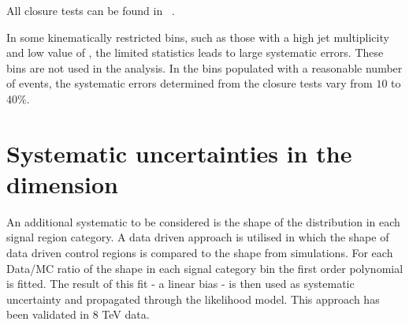 All closure tests can be found in ~\cite{alphaTnote}.


In some kinematically restricted bins, such as those with a high jet multiplicity and low value of \scalht, the
limited statistics leads to large systematic errors. These bins are not used in the analysis. 
In the bins populated with a reasonable number of events, the systematic errors determined from the closure tests vary from $10$ to
$40\%$.


\section{Systematic uncertainties in the \mht dimension}

An additional systematic to be considered is the shape of the \mht distribution in each signal region category. 
A data driven approach is utilised in which the shape of data driven control regions is compared to the \mht shape from simulations.
For each Data/MC ratio of the shape in each signal category bin the first order polynomial is fitted. The result of this fit - a linear bias - 
is then used as systematic uncertainty and propagated through the likelihood model.
This approach has been validated in 8 TeV data. 




